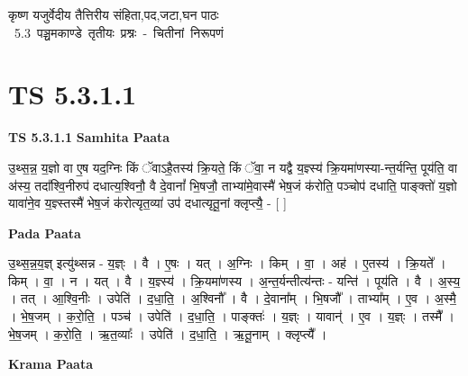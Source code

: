 \documentclass[17pt]{extarticle}
\begin{document}
\begin{titlepage}
    \begin{center}
 
\begin{sanskrit}
    { \Large
    कृष्ण यजुर्वेदीय तैत्तिरीय संहिता,पद,जटा,घन पाठः 
    }
    \\
    \vspace{2.5cm}
    \mbox{ \Large
    5.3      पञ्चमकाण्डे तृतीयः प्रश्नः - चितीनां निरूपणं   }
\end{sanskrit}
\end{center}

\end{titlepage}
\tableofcontents
{}
\pagebreak


\section{ TS 5.3.1.1 }

\textbf{TS 5.3.1.1 } \newline
\textbf{Samhita Paata} \newline

उ॒थ्स॒न्न॒ य॒ज्ञो वा ए॒ष यद॒ग्निः किं ॅवाऽहै॒तस्य॑ क्रि॒यते॒ किं ॅवा॒ न यद्वै य॒ज्ञ्स्य॑ क्रि॒यमा॑णस्या-न्त॒र्यन्ति॒ पूय॑ति॒ वा अ॑स्य॒ तदा᳚श्वि॒नीरुप॑ दधात्य॒श्विनौ॒ वै दे॒वानां᳚ भि॒षजौ॒ ताभ्या॑मे॒वास्मै॑ भेष॒जं क॑रोति॒ पञ्चोप॑ दधाति॒ पाङ्क्तो॑ य॒ज्ञो यावा॑ने॒व य॒ज्ञ्स्तस्मै॑ भेष॒जं क॑रोत्यृत॒व्या॑ उप॑ दधात्यृतू॒नां क्लृप्त्यै॒ - [  ] \newline

\textbf{Pada Paata} \newline

उ॒थ्स॒न्न॒य॒ज्ञ् इत्यु॑थ्सन्न - य॒ज्ञ्ः । वै । ए॒षः । यत् । अ॒ग्निः । किम् । वा॒ । अह॑ । ए॒तस्य॑ । क्रि॒यते᳚ । किम् । वा॒ । न । यत् । वै । य॒ज्ञ्स्य॑ । क्रि॒यमा॑णस्य । अ॒न्त॒र्यन्तीत्य॑न्तः - यन्ति॑ । पूय॑ति । वै । अ॒स्य॒ । तत् । आ॒श्वि॒नीः । उपेति॑ । द॒धा॒ति॒ । अ॒श्विनौ᳚ । वै । दे॒वाना᳚म् । भि॒षजौ᳚ । ताभ्या᳚म् । ए॒व । अ॒स्मै॒ । भे॒ष॒जम् । क॒रो॒ति॒ । पञ्च॑ । उपेति॑ । द॒धा॒ति॒ । पाङ्क्तः॑ । य॒ज्ञ्ः । यावान्॑ । ए॒व । य॒ज्ञ्ः । तस्मै᳚ । भे॒ष॒जम् । क॒रो॒ति॒ । ऋ॒त॒व्याः᳚ । उपेति॑ । द॒धा॒ति॒ । ऋ॒तू॒नाम् । क्लृप्त्यै᳚ ।  \newline


\textbf{Krama Paata} \newline
\end{document}
